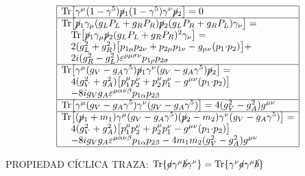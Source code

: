 $$\begin{array}{|l|}
\hline
\text{Tr}\big[\gamma^\mu(1-\gamma^5)\cancel{p}_1 (1-\gamma^5)\gamma^\nu\cancel{p}_2\big] = 0 \\
\hline
\text{Tr}\big[\cancel{p}_1\gamma_\mu(g_L P_L + g_R P_R)\cancel{p}_2(g_L P_R + g_R P_L)\gamma_\nu\big] =\\
\quad \text{Tr}\big[\cancel{p}_1\gamma_\mu \cancel{p}_2(g_L P_L + g_R P_R)^2\gamma_\nu\big] =\\
\quad 2(g_L^2+g_R^2)\big[p_{1\mu}p_{2\nu}+p_{2\mu}p_{1\nu}-g_{\mu\nu}(p_1{\cdot}p_2)\big] +\\
\quad 2i(g_R^2-g_L^2)\varepsilon^{\rho\mu\sigma\nu}p_{1\rho}p_{2\sigma} \\
\hline
\text{Tr}\big[\gamma^\mu(g_V - g_A\gamma^5)\cancel{p}_1\gamma^\nu(g_V-g_A\gamma^5)\cancel{p}_2\big] = \\
\quad 4(g_V^2+g_A^2)\big[p_1^\mu p_2^\nu+p_2^\mu p_1^\nu-g^{\mu\nu}(p_1{\cdot}p_2)\big] \\
\quad - 8ig_V g_A\varepsilon^{\mu\alpha\nu\beta}p_{1\alpha}p_{2\beta} \\
\hline
\text{Tr}\big[\gamma^\mu(g_V-g_A\gamma^5)\gamma^\nu(g_V-g_A\gamma^5)\big] = 4(g_V^2-g_A^2)g^{\mu\nu} \\
\hline
\text{Tr}\big[(\cancel{p}_1+m_1)\gamma^\mu(g_V-g_A\gamma^5)(\cancel{p}_2-m_2)\gamma^\nu(g_V-g_A\gamma^5)\big] = \\
\quad 4(g_V^2+g_A^2)\big[p_1^\mu p_2^\nu+p_2^\mu p_1^\nu-g^{\mu\nu}(p_1{\cdot}p_2)\big] \\
\quad - 8ig_Vg_A\varepsilon^{\mu\alpha\nu\beta}p_{1\alpha}p_{2\beta} - 4m_1m_2(g_V^2-g_A^2)g^{\mu\nu} \\
\hline
\end{array}$$

\newcolumn



\begin{center}
    PROPIEDAD CÍCLICA TRAZA: $\operatorname{Tr}\{\cancel{a}\gamma^\mu\cancel{b}\gamma^\nu\} = \operatorname{Tr}\{\gamma^\nu \cancel{a}\gamma^\mu\cancel{b}\}$
\end{center}

